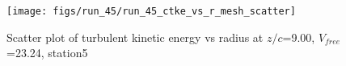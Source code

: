 \begin{figure}[H]
\centering
\texttt{[image: figs/run\_45/run\_45\_ctke\_vs\_r\_mesh\_scatter]}
\caption{Scatter plot of turbulent kinetic energy vs radius at $z/c$=9.00, $V_{free}$=23.24, station5}
\label{fig:run_45_ctke_vs_r_mesh_scatter}
\end{figure}


